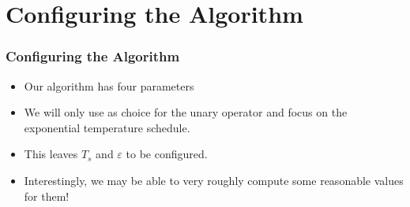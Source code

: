 \documentclass[mathserif]{beamer}%
\begin{document}
\section{Configuring the Algorithm}%
%
\begin{frame}%
\frametitle{Configuring the Algorithm}%
\begin{itemize}%
\item Our algorithm has four parameters%
\item<6-> We will only use  as choice for the unary operator and focus on the exponential temperature schedule.%
\item<7-> This leaves $T_s$ and $\varepsilon$ to be configured.%
\item<8-> Interestingly, we may be able to \alert{very roughly compute} some reasonable values for them!%
\end{itemize}%
\end{frame}%
%
\end{document}
